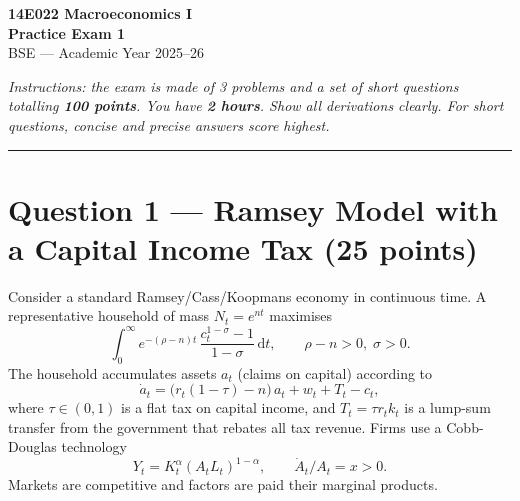 \documentclass[a4paper,11pt]{article}
\newcommand{\dd}{\mathrm{d}}
\begin{document}

\begin{center}
    {\LARGE \textbf{14E022 Macroeconomics I}}\\[6pt]
    {\Large \textbf{Practice Exam 1}}\\[8pt]
    {\large BSE --- Academic Year 2025--26}
\end{center}

\vspace{8pt}
\noindent\textit{Instructions: the exam is made of 3 problems and a set of short questions totalling \textbf{100 points}.
You have \textbf{2 hours}. Show all derivations clearly. For short questions, concise and precise answers score highest.}
\vspace{4pt}

\noindent\rule{\textwidth}{0.4pt}

\section{Question 1 --- Ramsey Model with a Capital Income Tax \hfill (25 points)}

Consider a standard Ramsey/Cass/Koopmans economy in continuous time.  A representative household of
mass $N_t = e^{nt}$ maximises
\[
    \int_0^{\infty} e^{-(\rho - n)t}\,\frac{c_t^{1-\sigma}-1}{1-\sigma}\,\dd t,
    \qquad \rho - n > 0,\; \sigma > 0.
\]
The household accumulates assets $a_t$ (claims on capital) according to
\[
    \dot{a}_t = \bigl(r_t(1-\tau) - n\bigr)\,a_t + w_t + T_t - c_t,
\]
where $\tau \in (0,1)$ is a flat tax on capital income, and $T_t = \tau r_t k_t$ is a lump-sum
transfer from the government that rebates all tax revenue.  Firms use a Cobb-Douglas technology
\[
    Y_t = K_t^{\alpha}(A_t L_t)^{1-\alpha}, \qquad \dot{A}_t/A_t = x > 0.
\]
Markets are competitive and factors are paid their marginal products.
\end{document}
